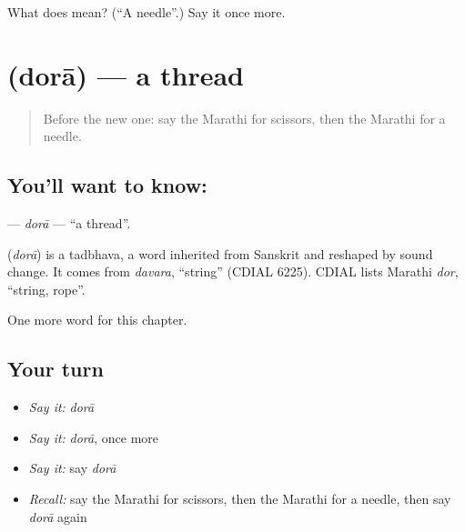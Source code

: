 \begin{tcolorbox}[breakable,colback=teal!4,colframe=teal!35!black,title={Before you move on}]
What does  mean? (\textquotedblleft{}A needle\textquotedblright{}.) Say it once more.
\end{tcolorbox}
\section[\texorpdfstring{\mr{दोरा} (dorā)}{दोरा (dorā)}]{ (dorā) — a thread}

\label{lesson:MR-C132-dora}



\begin{quote}
Before the new one: say the Marathi for scissors, then the Marathi for a needle.
\end{quote}

\subsection*{You'll want to know: }
\textbf{} — \emph{dorā} — \textquotedblleft{}a thread\textquotedblright{}.

\begin{cousinweb}
\textbf{} (\emph{dorā}) is a tadbhava, a word inherited from Sanskrit and reshaped by sound change. It comes from \emph{davara}, \textquotedblleft{}string\textquotedblright{} (CDIAL 6225). CDIAL lists Marathi \emph{dor}, \textquotedblleft{}string, rope\textquotedblright{}.
\end{cousinweb}

\begin{grammarlens}[title={What you've built}]
One more word for this chapter.
\end{grammarlens}

\subsection*{Your turn}
\begin{itemize}
\raggedright
  \item \emph{Say it:} \emph{dorā}
  \item \emph{Say it:} \emph{dorā}, once more
  \item \emph{Say it:} say \emph{dorā}
  \item \emph{Recall:} say the Marathi for scissors, then the Marathi for a needle, then say \emph{dorā} again
\end{itemize}

